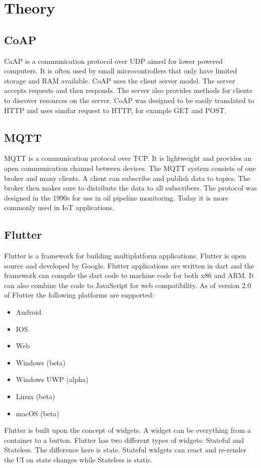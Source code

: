 \section{Theory}
\label{ch:theory}
\noindent

\subsection{CoAP}
CaAP is a communication protocol over UDP aimed for lower powered computers. It is often used by small microcontrollers that only have limited storage and RAM available. CoAP uses the client server model. The server accepts requests and then responds. The server also provides methods for clients to discover resources on the server. CoAP was designed to be easily translated to HTTP and uses similar request to HTTP, for example GET and POST. \cite{rfc7252}

\subsection{MQTT}
MQTT is a communication protocol over TCP. It is lightweight and provides an open communication channel between devices. The MQTT system consists of one broker and many clients. A client can subscribe and publish data to topics. The broker then makes sure to distribute the data to all subscribers. The protocol was designed in the 1990s for use in oil pipeline monitoring. Today it is more commonly used in IoT applications. \cite{mqtt}
\subsection{Flutter}
Flutter is a framework for building multiplatform applications. Flutter is open source and developed by Google. Flutter applications are written in dart and the framework can compile the dart code to machine code for both x86 and ARM. It can also combine the code to JavaScript for web compatibility. \cite{flutter} As of version 2.0 of Flutter the following platforms are supported: \cite{flutterPlat}
\begin{itemize}
    \item Android
    \item IOS
    \item Web
    \item Windows (beta)
    \item Windows UWP (alpha)
    \item Linux (beta)
    \item macOS (beta)
\end{itemize}

Flutter is built upon the concept of widgets. A widget can be everything from a container to a button. Flutter has two different types of widgets: Stateful and Stateless. The difference here is state. Stateful widgets can react and re-render the UI on state changes while Stateless is static. 